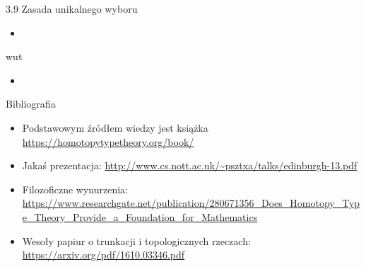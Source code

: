 \documentclass{beamer}
\begin{document}
\begin{frame}{3.9 Zasada unikalnego wyboru}
\begin{itemize}
	\item
\end{itemize}
\end{frame}

\begin{frame}{wut}
\begin{itemize}
	\item
\end{itemize}
\end{frame}

\begin{frame}{Bibliografia}
\begin{itemize}
	\item Podstawowym źródłem wiedzy jest książka \url{https://homotopytypetheory.org/book/}
	\item Jakaś prezentacja: \url{http://www.cs.nott.ac.uk/~psztxa/talks/edinburgh-13.pdf}
	\item Filozoficzne wynurzenia: \url{https://www.researchgate.net/publication/280671356_Does_Homotopy_Type_Theory_Provide_a_Foundation_for_Mathematics}
	\item Wesoły papiur o trunkacji i topologicznych rzeczach: \url{https://arxiv.org/pdf/1610.03346.pdf}
\end{itemize}
\end{frame}
\end{document}

